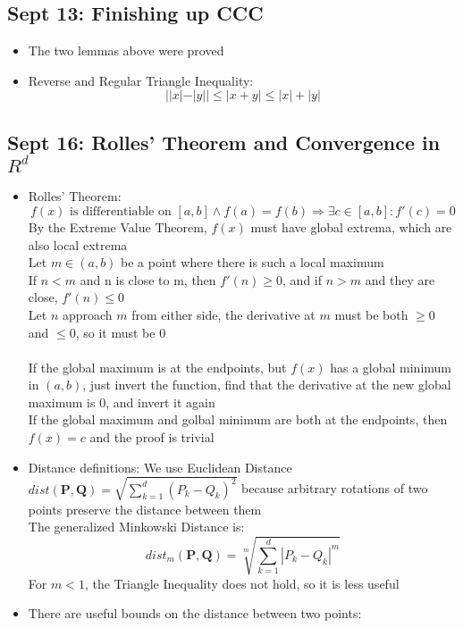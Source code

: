 \documentclass[10pt, oneside]{article}
\let\leq\leqslant
\let\geq\geqslant
\renewcommand{\vec}[1]{\mathbf{#1}}
\begin{document}
\subsection{Sept 13: Finishing up CCC}
\begin{itemize}
    \item The two lemmas above were proved
    \item Reverse and Regular Triangle Inequality:
        \[||x|-|y|| \leq |x+y| \leq |x|+|y|\]
\end{itemize}

\subsection{Sept 16: Rolles' Theorem and Convergence in $R^d$}
\begin{itemize}
    \item Rolles' Theorem:
        \[f(x) \text{ is differentiable on } [a,b] \land f(a) = f(b) \Rightarrow \exists c \in [a,b] : f'(c) = 0\]
        By the Extreme Value Theorem, $f(x)$ must have global extrema, which are also local extrema\\
        Let $m \in (a,b)$ be a point where there is such a local maximum\\
        If $n < m$ and n is close to m, then $f'(n) \geq 0$, and if $n > m$ and they are close, $f'(n) \leq 0$\\
        Let $n$ approach $m$ from either side, the derivative at $m$ must be both $\geq 0$ and $\leq 0$, so it must be $0$\\
        \\
        If the global maximum is at the endpoints, but $f(x)$ has a global minimum in $(a,b)$, just invert the function, find that the derivative at the new global maximum is $0$, and invert it again
        \\
        If the global maximum and golbal minimum are both at the endpoints, then $f(x) = c$ and the proof is trivial
    \item Distance definitions:
        We use Euclidean Distance $\displaystyle dist(\vec{P},\vec{Q}) = \sqrt{\sum_{k=1}^{d}{(P_k - Q_k)^2}}$ because arbitrary rotations of two points preserve the distance between them
        \\
        The generalized Minkowski Distance is:
            \[dist_m(\vec{P},\vec{Q}) = \sqrt[m]{\sum_{k=1}^{d}|P_k - Q_k|^m}\]
        For $m < 1$, the Triangle Inequality does not hold, so it is less useful
    \item There are useful bounds on the distance between two points:

\end{itemize}
\end{document}
